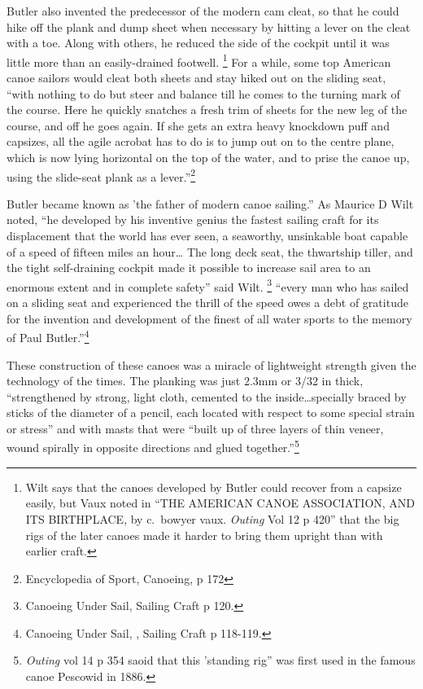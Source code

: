 \documentclass[
  letterpaper,
]{scrbook}
\begin{document}
Butler also invented the predecessor of the modern cam cleat, so that he
could hike off the plank and dump sheet when necessary by hitting a
lever on the cleat with a toe. Along with others, he reduced the side of
the cockpit until it was little more than an easily-drained footwell.
\footnote{Wilt says that the canoes developed by Butler could recover
  from a capsize easily, but Vaux noted in ``THE AMERICAN CANOE
  ASSOCIATION, AND ITS BIRTHPLACE, by c.~bowyer vaux. \emph{Outing} Vol
  12 p 420'' that the big rigs of the later canoes made it harder to
  bring them upright than with earlier craft.} For a while, some top
American canoe sailors would cleat both sheets and stay hiked out on the
sliding seat, ``with nothing to do but steer and balance till he comes
to the turning mark of the course. Here he quickly snatches a fresh trim
of sheets for the new leg of the course, and off he goes again. If she
gets an extra heavy knockdown puff and capsizes, all the agile acrobat
has to do is to jump out on to the centre plane, which is now lying
horizontal on the top of the water, and to prise the canoe up, using the
slide-seat plank as a lever.''\footnote{Encyclopedia of Sport, Canoeing,
  p 172}

Butler became known as 'the father of modern canoe sailing.'' As Maurice
D Wilt noted, ``he developed by his inventive genius the fastest sailing
craft for its displacement that the world has ever seen, a seaworthy,
unsinkable boat capable of a speed of fifteen miles an hour\ldots{} The
long deck seat, the thwartship tiller, and the tight self-draining
cockpit made it possible to increase sail area to an enormous extent and
in complete safety'' said Wilt. \footnote{Canoeing Under Sail, Sailing
  Craft p 120.} ``every man who has sailed on a sliding seat and
experienced the thrill of the speed owes a debt of gratitude for the
invention and development of the finest of all water sports to the
memory of Paul Butler.''\footnote{Canoeing Under Sail, , Sailing Craft p
  118-119.}

These construction of these canoes was a miracle of lightweight strength
given the technology of the times. The planking was just 2.3mm or 3/32
in thick, ``strengthened by strong, light cloth, cemented to the
inside\ldots specially braced by sticks of the diameter of a pencil,
each located with respect to some special strain or stress'' and with
masts that were ``built up of three layers of thin veneer, wound
spirally in opposite directions and glued together.''\footnote{\emph{Outing}
  vol 14 p 354 saoid that this 'standing rig'' was first used in the
  famous canoe Pescowid in 1886.}
\end{document}
